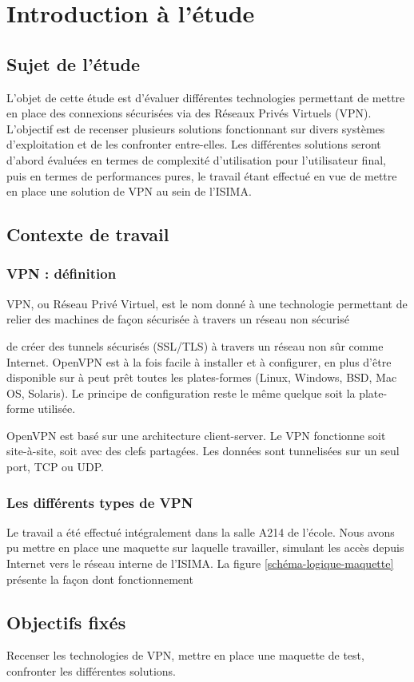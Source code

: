 \section{Introduction à l'étude}
\subsection{Sujet de l'étude}
L'objet de cette étude est d'évaluer différentes technologies permettant de mettre en place des connexions sécurisées via des Réseaux Privés Virtuels (VPN). L'objectif est de recenser plusieurs solutions fonctionnant sur divers systèmes d'exploitation et de les confronter entre-elles. Les différentes solutions seront d'abord évaluées en termes de complexité d'utilisation pour l'utilisateur final, puis en termes de performances pures, le travail étant effectué en vue de mettre en place une solution de VPN au sein de l'ISIMA.

\subsection{Contexte de travail}
\subsubsection{VPN : définition}
VPN, ou Réseau Privé Virtuel, est le nom donné à une technologie permettant de relier des machines de façon sécurisée à travers un réseau non sécurisé

 de créer des tunnels sécurisés (SSL/TLS) à travers un réseau non sûr comme Internet. OpenVPN est à la fois facile à installer et à configurer, en plus d'être disponible sur à peut prêt toutes les plates-formes (Linux, Windows, BSD, Mac OS, Solaris). Le principe de configuration reste le même quelque soit la plate-forme utilisée.

OpenVPN est basé sur une architecture client-server. Le VPN fonctionne soit site-à-site, soit avec des clefs partagées. Les données sont tunnelisées sur un seul port, TCP ou UDP.


\subsubsection{Les différents types de VPN}

Le travail a été effectué intégralement dans la salle A214 de l'école. Nous avons pu mettre en place une maquette sur laquelle travailler, simulant les accès depuis Internet vers le réseau interne de l'ISIMA. La figure \ref{schéma-logique-maquette} présente la façon dont  fonctionnement

\subsection{Objectifs fixés}
Recenser les technologies de VPN, mettre en place une maquette de test, confronter les différentes solutions.

\pagebreak
